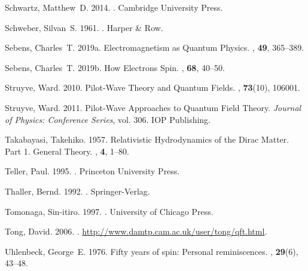 \documentclass[12pt,secnumarabic,amsmath,amssymb,balancelastpage,nofootinbib]{article}
\begin{document}
\begin{thebibliography}{}
Schwartz, Matthew~D. 2014.
.
\newblock Cambridge University Press.

Schweber, Silvan~S. 1961.
.
\newblock Harper \& Row.

Sebens, Charles~T. 2019a.
\newblock Electromagnetism as Quantum Physics.
, {\bf 49}, 365--389.

Sebens, Charles~T. 2019b.
\newblock How Electrons Spin.
, {\bf 68}, 40--50.

Struyve, Ward. 2010.
\newblock Pilot-Wave Theory and Quantum Fields.
, {\bf 73}(10), 106001.

Struyve, Ward. 2011.
\newblock Pilot-Wave Approaches to Quantum Field Theory.
 {\em Journal of Physics: Conference Series},
  vol. 306.
\newblock IOP Publishing.

Takabayasi, Takehiko. 1957.
\newblock Relativistic Hydrodynamics of the Dirac Matter. Part 1. General
  Theory.
, {\bf 4}, 1--80.

Teller, Paul. 1995.
.
\newblock Princeton University Press.

Thaller, Bernd. 1992.
.
\newblock Springer-Verlag.

Tomonaga, Sin-itiro. 1997.
.
\newblock University of Chicago Press.

Tong, David. 2006.
.
\newblock \url{http://www.damtp.cam.ac.uk/user/tong/qft.html}.

Uhlenbeck, George~E. 1976.
\newblock Fifty years of spin: Personal reminiscences.
, {\bf 29}(6), 43--48.


\end{thebibliography}
\end{document}
